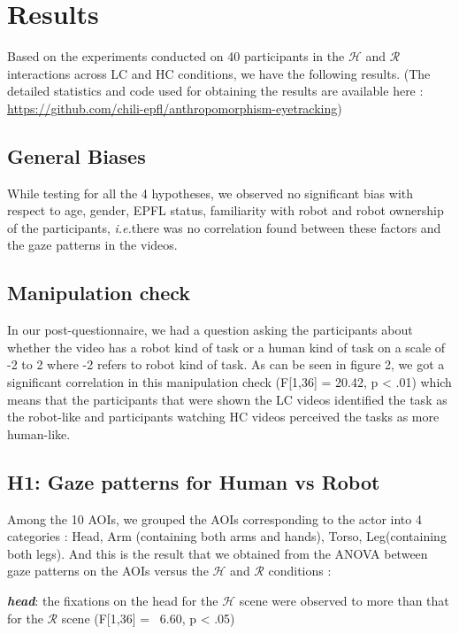 \documentclass[a4,twocolumn,10pt]{article}
\newcommand{\ie}{{\textit{i.e.\xspace}}}
\begin{document}
\section{Results}

Based on the experiments conducted on 40 participants in the $\mathcal{H}$ and
$\mathcal{R}$ interactions across LC and HC conditions, we have the following
results. (The detailed statistics and code used for obtaining the results are
available here : \url{https://github.com/chili-epfl/anthropomorphism-eyetracking})

\subsection{General Biases}

While testing for all the 4 hypotheses, we observed no significant bias with
respect to age, gender, EPFL status, familiarity with robot and robot ownership
of the participants, \ie there was no correlation found between these factors
and the gaze patterns in the videos.

\subsection{Manipulation check}

In our post-questionnaire, we had a question asking the participants about
whether the video has a robot kind of task or a human kind of task on a scale of
-2 to 2 where -2 refers to robot kind of task. As can be seen in figure 2, we
got a significant correlation in this manipulation check (F[1,36] = 20.42, p <
.01) which means that the participants that were shown the LC videos identified
the task as the robot-like and participants watching HC videos perceived the
tasks as more human-like. 




\subsection{H1: Gaze patterns for Human vs Robot}

Among the 10 AOIs, we grouped the AOIs corresponding to the actor into 4
categories : Head, Arm (containing both arms and hands), Torso, Leg(containing
both legs). And this is the result that we obtained from the ANOVA between gaze
patterns on the AOIs versus the $\mathcal{H}$ and $\mathcal{R}$ conditions :

\textit{\textbf{head}}: the fixations on the head for the $\mathcal{H}$ scene
were observed to more than that for the $\mathcal{R}$ scene (F[1,36] = \ 6.60, p
< .05)
\end{document}
